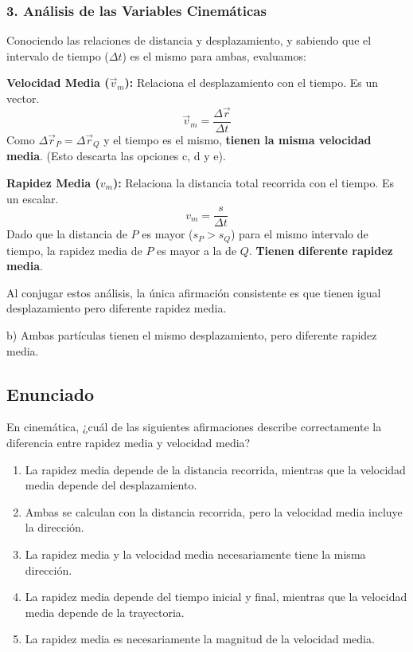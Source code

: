 \documentclass[12pt, a4paper]{article}
\begin{document}
\subsubsection*{3. Análisis de las Variables Cinemáticas}
Conociendo las relaciones de distancia y desplazamiento, y sabiendo que el intervalo de tiempo ($\Delta t$) es el mismo para ambas, evaluamos:

\textbf{Velocidad Media ($\vec{v}_m$):} Relaciona el desplazamiento con el tiempo. Es un vector.
$$ \vec{v}_m = \frac{\Delta\vec{r}}{\Delta t} $$
Como $\Delta\vec{r}_P = \Delta\vec{r}_Q$ y el tiempo es el mismo, \textbf{tienen la misma velocidad media}. (Esto descarta las opciones c, d y e).

\textbf{Rapidez Media ($v_m$):} Relaciona la distancia total recorrida con el tiempo. Es un escalar.
$$ v_m = \frac{s}{\Delta t} $$
Dado que la distancia de $P$ es mayor ($s_P > s_Q$) para el mismo intervalo de tiempo, la rapidez media de $P$ es mayor a la de $Q$. \textbf{Tienen diferente rapidez media}.

Al conjugar estos análisis, la única afirmación consistente es que tienen igual desplazamiento pero diferente rapidez media.

\begin{tcolorbox}[colback=green!5!white, colframe=green!50!black, title=Respuesta Final]
\centering \Large b) Ambas partículas tienen el mismo desplazamiento, pero diferente rapidez media.
\end{tcolorbox}

\newpage

\subsection*{Enunciado}
En cinemática, ¿cuál de las siguientes afirmaciones describe correctamente la diferencia entre rapidez media y velocidad media?

\begin{enumerate}[label=\alph*)]
    \item La rapidez media depende de la distancia recorrida, mientras que la velocidad media depende del desplazamiento.
    \item Ambas se calculan con la distancia recorrida, pero la velocidad media incluye la dirección.
    \item La rapidez media y la velocidad media necesariamente tiene la misma dirección.
    \item La rapidez media depende del tiempo inicial y final, mientras que la velocidad media depende de la trayectoria.
    \item La rapidez media es necesariamente la magnitud de la velocidad media.
\end{enumerate}
\end{document}
